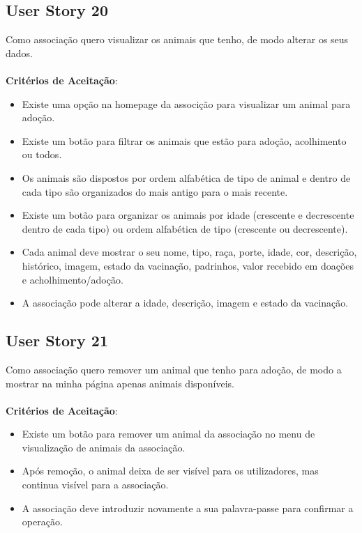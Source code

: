 \documentclass[a4paper,11pt]{article}
\begin{document}
\subsection{User Story 20}
Como associação quero visualizar os animais que tenho, de modo alterar os seus dados.\\\\
\textbf{Critérios de Aceitação}:
\begin{itemize}
  \item Existe uma opção na homepage da associção para visualizar um animal para adoção.
  \item Existe um botão para filtrar os animais que estão para adoção, acolhimento ou todos.
  \item Os animais são dispostos por ordem alfabética de tipo de animal e dentro de cada tipo são organizados do mais antigo para o mais recente.
  \item Existe um botão para organizar os animais por idade (crescente e decrescente dentro de cada tipo) ou ordem alfabética de tipo (crescente ou decrescente).
  \item Cada animal deve mostrar o seu nome, tipo, raça, porte, idade, cor, descrição, histórico, imagem, estado da vacinação, padrinhos, valor recebido em doações e acholhimento/adoção.
  \item A associação pode alterar a idade, descrição, imagem e estado da vacinação.
\end{itemize}

\subsection{User Story 21}
Como associação quero remover um animal que tenho para adoção, de modo a mostrar na minha página apenas animais disponíveis.\\\\
\textbf{Critérios de Aceitação}:
\begin{itemize}
  \item Existe um botão para remover um animal da associação no menu de visualização de animais da associação.
  \item Após remoção, o animal deixa de ser visível para os utilizadores, mas continua visível para a associação.
  \item A associação deve introduzir novamente a sua palavra-passe para confirmar a operação.
\end{itemize}
\end{document}
